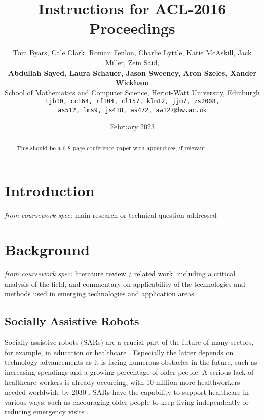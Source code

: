 \documentclass[11pt]{article}
\title{Instructions for ACL-2016 Proceedings}
\author{Tom Byars, Cale Clark, Roman Fenlon, Charlie Lyttle, Katie McAskill, Jack Miller, Zein Said, \\
{\bf Abdullah Sayed, Laura Schauer, Jason Sweeney, Aron Szeles, Xander Wickham} \\
School of Mathematics and Computer Science, Heriot-Watt University, Edinburgh \\ {\tt {tjb10, cc164, rf104, cl157, klm12, jjm7, zs2008,}} \\ {\tt {as512, lms9, js418, as472, aw127}@hw.ac.uk}}
\date{February 2023}
\begin{document}
\maketitle
\begin{abstract}
  This should be a 6-8 page conference paper with appendices, if relevant. 
\end{abstract}


\section{Introduction}
\label{sec:introduction}

\textit{from coursework spec:} main research or technical question addressed


\section{Background}
\label{sec:background}

\textit{from coursework spec:} literature review / related work, including a critical analysis of the field, and commentary on applicability of the technologies and methods used in emerging technologies and application areas

\subsection{Socially Assistive Robots}
\label{subsec:socially_assistive_robots}
Socially assistive robots (SARs) are a crucial part of the future of many sectors, for example, in education or healthcare \cite{gunson_visually_aware_2022}. Especially the latter depends on technology advancements as it is facing numerous obstacles in the future, such as increasing spendings and a growing percentage of older people. A serious lack of healthcare workers is already occurring, with 10 million more healthworkers needed worldwide by 2030 \cite{cooper_ari_2020,Health_workforce_2023}. SARs have the capability to support healthcare in various ways, such as encouraging older people to keep living independently or reducing emergency visits \cite{cooper_ari_2020}.
\end{document}
